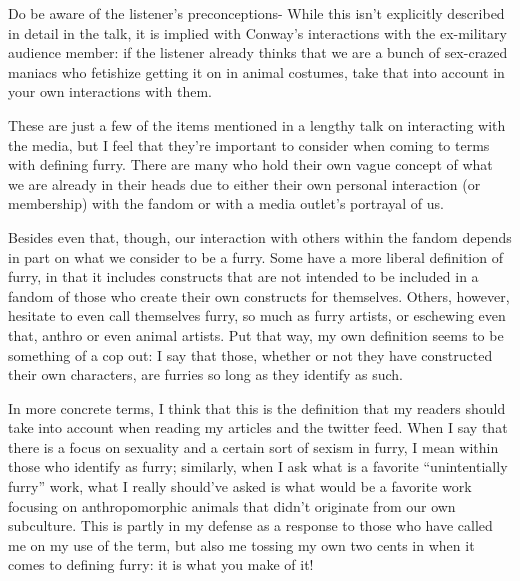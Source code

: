 Do be aware of the listener's preconceptions- While this isn't explicitly described in detail in the talk, it is implied with Conway's interactions with the ex-military audience member: if the listener already thinks that we are a bunch of sex-crazed maniacs who fetishize getting it on in animal costumes, take that into account in your own interactions with them.

These are just a few of the items mentioned in a lengthy talk on interacting with the media, but I feel that they're important to consider when coming to terms with defining furry. There are many who hold their own vague concept of what we are already in their heads due to either their own personal interaction (or membership) with the fandom or with a media outlet's portrayal of us.

Besides even that, though, our interaction with others within the fandom depends in part on what we consider to be a furry. Some have a more liberal definition of furry, in that it includes constructs that are not intended to be included in a fandom of those who create their own constructs for themselves. Others, however, hesitate to even call themselves furry, so much as furry artists, or eschewing even that, anthro or even animal artists. Put that way, my own definition seems to be something of a cop out: I say that those, whether or not they have constructed their own characters, are furries so long as they identify as such.

In more concrete terms, I think that this is the definition that my readers should take into account when reading my articles and the twitter feed. When I say that there is a focus on sexuality and a certain sort of sexism in furry, I mean within those who identify as furry; similarly, when I ask what is a favorite ``unintentially furry'' work, what I really should've asked is what would be a favorite work focusing on anthropomorphic animals that didn't originate from our own subculture. This is partly in my defense as a response to those who have called me on my use of the term, but also me tossing my own two cents in when it comes to defining furry: it is what you make of it!
